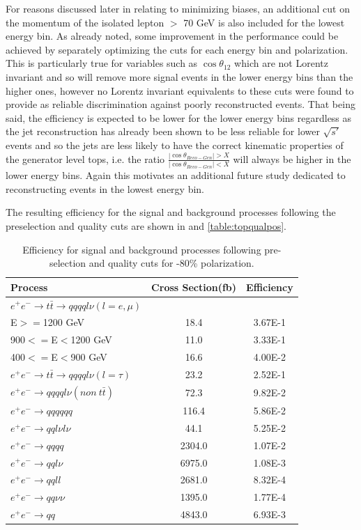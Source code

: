 For reasons discussed later in  relating to minimizing biases, an additional cut on the momentum of the isolated lepton $>$ 70 GeV is also included for the lowest energy bin. As already noted, some improvement in the performance could be achieved by separately optimizing the cuts for each energy bin and polarization. This is particularly true for variables such as $\cos\theta_{12}$ which are not Lorentz invariant and so will remove more signal events in the lower energy bins than the higher ones, however no Lorentz invariant equivalents to these cuts were found to provide as reliable discrimination against poorly reconstructed events. That being said, the efficiency is expected to be lower for the lower energy bins regardless as the jet reconstruction has already been shown to be less reliable for lower $\sqrt{s'}$ events and so the jets are less likely to have the correct kinematic properties of the generator level tops, i.e. the ratio  $\frac{|\cos\theta_{Reco-Gen}| > X}{|\cos\theta_{Reco-Gen}| < X}$ will always be higher in the lower energy bins. Again this motivates an additional future study dedicated to reconstructing events in the lowest energy bin.

The resulting efficiency for the signal and background processes following the preselection and quality cuts are shown in  and \ref{table:topqualpos}.

\begin{table}
  \centering
  \begin{tabular}{l | c | c }
    \toprule
    Process     & Cross Section(fb) & Efficiency  \\
    \midrule
    $e^+e^-\rightarrow t\bar{t} \rightarrow qqqql\nu (l=e,\mu)$&  &  \\
    E$>=$1200 GeV & 18.4 & 3.67E-1 \\
    900$<=$E$<$1200 GeV & 11.0 & 3.33E-1 \\
    400$<=$E$<$900 GeV & 16.6 & 4.00E-2 \\
    \midrule
    $e^+e^-\rightarrow t\bar{t} \rightarrow qqqql\nu (l=\tau)$& 23.2 & 2.52E-1 \\
    \midrule
    $e^+e^-\rightarrow qqqql\nu (non ~ t\bar{t})$& 72.3 & 9.82E-2\\
    \midrule
    $e^+e^-\rightarrow qqqqqq$ & 116.4 & 5.86E-2  \\
    \midrule
    $e^+e^-\rightarrow qql\nu l\nu$ & 44.1 & 5.25E-2 \\
    \midrule
    $e^+e^-\rightarrow qqqq$ & 2304.0 & 1.07E-2 \\
    \midrule
    $e^+e^-\rightarrow qql\nu$ & 6975.0 & 1.08E-3 \\
    \midrule
    $e^+e^-\rightarrow qqll$ & 2681.0 & 8.32E-4 \\
    \midrule
    $e^+e^-\rightarrow qq\nu\nu$ & 1395.0 & 1.77E-4 \\
    \midrule
    $e^+e^-\rightarrow qq$ & 4843.0 & 6.93E-3\\
    \bottomrule
  \end{tabular}
  \caption{Efficiency for signal and background processes following pre-selection and quality cuts for -80\% polarization.}
  \label{table:topqualneg}
\end{table}

